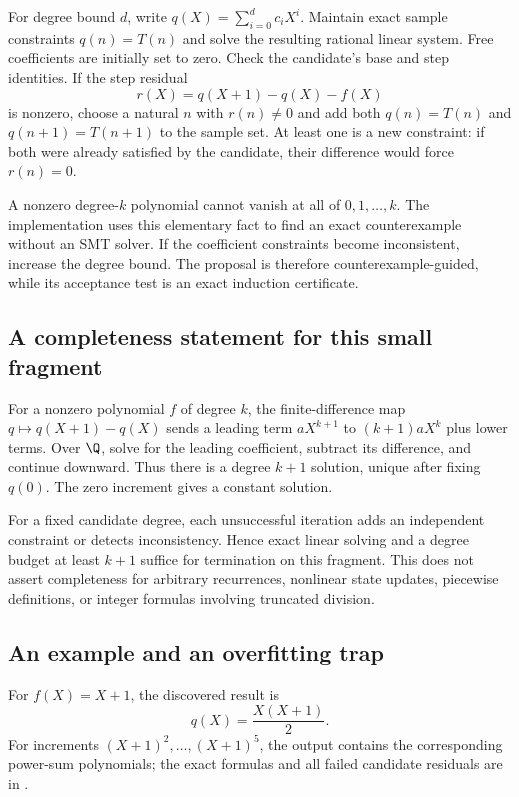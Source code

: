 For degree bound $d$, write $q(X)=\sum_{i=0}^d c_iX^i$. Maintain exact sample
constraints $q(n)=T(n)$ and solve the resulting rational linear system.
Free coefficients are initially set to zero. Check the candidate's base and
step identities. If the step residual
\[
r(X)=q(X+1)-q(X)-f(X)
\]
is nonzero, choose a natural $n$ with $r(n)\ne0$ and add both $q(n)=T(n)$ and
$q(n+1)=T(n+1)$ to the sample set. At least one is a new constraint: if both
were already satisfied by the candidate, their difference would force
$r(n)=0$.

A nonzero degree-$k$ polynomial cannot vanish at all of $0,1,\ldots,k$.
The implementation uses this elementary fact to find an exact counterexample
without an SMT solver. If the coefficient constraints become inconsistent,
increase the degree bound. The proposal is therefore counterexample-guided,
while its acceptance test is an exact induction certificate.

\subsection{A completeness statement for this small fragment}

For a nonzero polynomial $f$ of degree $k$, the finite-difference map
$q\mapsto q(X+1)-q(X)$ sends a leading term $aX^{k+1}$ to
$(k+1)aX^k$ plus lower terms. Over $\Q$, solve for the leading coefficient,
subtract its difference, and continue downward. Thus there is a degree
$k+1$ solution, unique after fixing $q(0)$. The zero increment gives a constant
solution.

For a fixed candidate degree, each unsuccessful iteration adds an independent
constraint or detects inconsistency. Hence exact linear solving and a degree
budget at least $k+1$ suffice for termination on this fragment. This does not
assert completeness for arbitrary recurrences, nonlinear state updates,
piecewise definitions, or integer formulas involving truncated division.

\subsection{An example and an overfitting trap}

For $f(X)=X+1$, the discovered result is
\[
q(X)=\frac{X(X+1)}2.
\]
For increments $(X+1)^2,\ldots,(X+1)^5$, the output contains the corresponding
power-sum polynomials; the exact formulas and all failed candidate residuals
are in .


